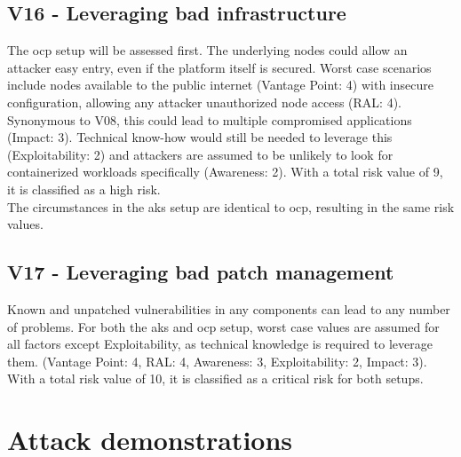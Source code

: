 \newpage
\subsection{V16 - Leveraging bad infrastructure}

The \gls{ocp} setup will be assessed first.
The underlying nodes could allow an attacker easy entry, even if the platform itself is secured.
Worst case scenarios include nodes available to the public internet (Vantage Point: 4) with insecure configuration, allowing any attacker unauthorized node access (RAL: 4). Synonymous to V08, this could lead to multiple compromised applications (Impact: 3). Technical know-how would still be needed to leverage this (Exploitability: 2) and attackers are assumed to be unlikely to look for containerized workloads specifically (Awareness: 2).
With a total risk value of 9, it is classified as a high risk. \\
The circumstances in the \gls{aks} setup are identical to \gls{ocp}, resulting in the same risk values.

\subsection{V17 - Leveraging bad patch management}

Known and unpatched vulnerabilities in any components can lead to any number of problems. For both the \gls{aks} and \gls{ocp} setup, worst case values are assumed for all factors except Exploitability, as technical knowledge is required to leverage them. (Vantage Point: 4, RAL: 4, Awareness: 3, Exploitability: 2, Impact: 3).
With a total risk value of 10, it is classified as a critical risk for both setups. \\

\newpage
\section{Attack demonstrations}

